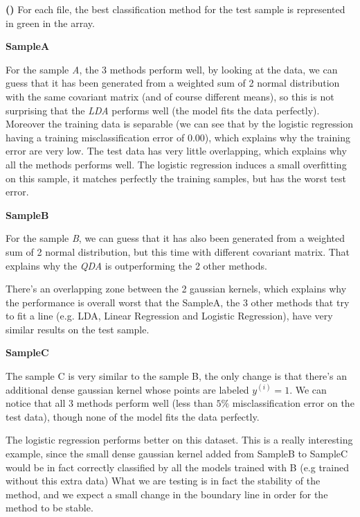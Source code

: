 \documentclass[a4paper, 11pt]{article}
\newcounter{cquestion}[subsection]
\renewcommand{\thecquestion}{\alph{cquestion}}
\newenvironment{question}
{\par \vspace{0.5em} \noindent \stepcounter{cquestion} \hspace{-1em}
 \textbf{(\thecquestion)}}
{}
\newcommand{\name}[1]{\emph{#1}}
\newcommand{\ipart}[1]{\vspace{0.5em}\textbf{#1}\vspace{0.5em}}
\begin{document}
\begin{question}
  For each file, the best classification method for the test
  sample is represented in green in the array.

  \ipart{SampleA}

  For the sample \name{A}, the 3 methods perform well, by looking
  at the data, we can guess that it has been generated from a
  weighted sum of 2 normal distribution with the same covariant
  matrix (and of course different means), so this is not
  surprising that the \name{LDA} performs well (the model fits the
  data perfectly). Moreover the training data is separable (we
  can see that by the logistic regression having a training
  misclassification error of $0.00$), which explains why the
  training error are very low. The test data has very little
  overlapping, which explains why all the methods performs
  well. The logistic regression induces a small overfitting on
  this sample, it matches perfectly the training samples, but has
  the worst test error.

  \ipart{SampleB}

  For the sample \name{B}, we can guess that it has also been
  generated from a weighted sum of 2 normal distribution, but this
  time with different covariant matrix. That explains why the
  \name{QDA} is outperforming the 2 other methods.

  There's an overlapping zone between the 2 gaussian kernels, which
  explains why the performance is overall worst that the SampleA, the
  3 other methods that try to fit a line (e.g. LDA, Linear Regression
  and Logistic Regression), have very similar results on the test
  sample.

  \ipart{SampleC}

  The sample C is very similar to the sample B, the only change is
  that there's an additional dense gaussian kernel whose points are
  labeled $y^{(i)} = 1$. We can notice that all 3 methods
  perform well (less than $5\%$ misclassification error on the test
  data), though none of the model fits the data perfectly.

  The logistic regression performs better on this dataset. This is a
  really interesting example, since the small dense gaussian kernel
  added from SampleB to SampleC would be in fact correctly classified
  by all the models trained with B (e.g trained without this extra data)
  What we are testing is in fact the stability of the method, and we
  expect a small change in the boundary line in order for the method to
  be stable.


\end{question}
\end{document}
